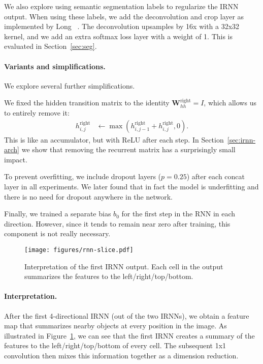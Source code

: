 \documentclass[10pt,twocolumn,letterpaper]{article}
\begin{document}
We also explore using semantic segmentation labels to regularize the IRNN
output.  When using these labels, we add the deconvolution and crop layer as
implemented by Long \etal~\cite{fcn}.  The deconvolution upsamples by 16x with a
32x32 kernel, and we add an extra softmax loss layer with a weight of 1.  This
is evaluated in Section~\ref{sec:seg}.

\paragraph{Variants and simplifications.} We explore several
further simplifications.

\begin{packed_enum}
\item We fixed the hidden transition matrix to the identity $\mathbf{W}_{hh}^\text{right}
= I$, which allows us to entirely remove it:
\begin{align}
  h_{i,j}^\text{right} &\gets \max\left( h_{i,j-1}^\text{right} + h_{i,j}^\text{right}, 0 \right).
  \label{eq:no-whh}
\end{align}
This is like an accumulator, but with ReLU after each step.  In
Section~\ref{sec:irnn-arch} we show that removing the recurrent matrix has a
surprisingly small impact.
\item To prevent overfitting, we include dropout layers ($p = 0.25$)
after each concat layer in all experiments.  We later found that in fact the model is
underfitting and there is no need for dropout anywhere in the network.
\item Finally, we trained a separate bias $b_0$ for the first step in the RNN
in each direction. However, since it tends to remain near zero after training,
this component is not really necessary.
\end{packed_enum}\begin{figure}[t]
  \begin{center}
   \texttt{[image: figures/rnn-slice.pdf]}
  \end{center}
  \vspace{-6pt}
  \caption{Interpretation of the first IRNN output.  Each cell in the output
  summarizes the features to the left/right/top/bottom.}
  \label{fig:rnn-slice}
  \vspace{-6pt}
\end{figure}\paragraph{Interpretation.}
After the first 4-directional IRNN (out of the two IRNNs), we obtain a feature map that summarizes
nearby objects at every position in the image.  As illustrated in
Figure~\ref{fig:rnn-slice}, we can see that the first IRNN creates a summary of
the features to the left/right/top/bottom of every cell.  The subsequent 1x1
convolution then mixes this information together as a dimension reduction.
\end{document}
